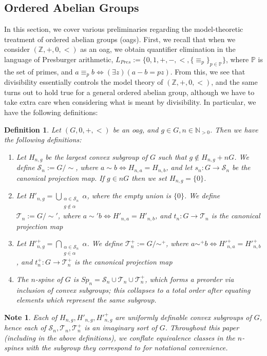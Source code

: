 \documentclass[a4paper,11pt]{article}
\newtheorem{definition}[theorem]{Definition}
\newtheorem*{note}{Note}
\renewcommand{\iff}{\Longleftrightarrow}
\newcommand{\nl}{\newline}
\newcommand{\Sn}{\mathcal{S}_n}
\newcommand{\Tn}{\mathcal{T}_n}
\newcommand{\Spn}{Sp_n}
\begin{document}
\subsection*{Ordered Abelian Groups}
In this section, we cover various preliminaries regarding the model-theoretic treatment of ordered abelian groups (oags). First, we recall that when we consider $(\mathbb{Z}, +, 0, <)$ as an oag, we obtain quantifier elimination in the language of Presburger arithmetic, $L_{Pres} := \{0, 1, +, -, <, \{\equiv_p\}_{p\in\mathbb{P}} \}$, where $\mathbb{P}$ is the set of primes, and $a\equiv_p b \iff (\exists z)(a-b = pz)$.
\nl\nl
From this, we see that divisibility essentially controls the model theory of $(\mathbb{Z}, +, 0, <)$, and the same turns out to hold true for a general ordered abelian group, although we have to take extra care when considering what is meant by divisibility. In particular, we have the following definitions:
\begin{definition}\label{SnTnTn^+}
	Let $(G, 0, +, <)$ be an oag, and $g\in G,n\in\mathbb{N}_{>0}$. Then we have the following definitions:
	\begin{enumerate}[(1)]
		\item Let $H_{n,g}$ be the largest convex subgroup of $G$ such that $g\notin H_{n,g} + nG$. We define $\Sn := G/\sim$, where $a\sim b\iff H_{n,a} = H_{n,b}$, and let $s_n:G\rightarrow\Sn$ be the canonical projection map. If $g\in nG$ then we set $H_{n,g} = \{0\}$.
		\item Let $H'_{n,g} = \bigcup\limits_{\substack{\alpha\in\Sn\\g\notin\alpha}}\alpha$, where the empty union is $\{0\}$. We define $\Tn := G/\sim'$, where $a\sim' b\iff H'_{n,a} = H'_{n,b}$, and $t_n:G\rightarrow\Tn$ is the canonical projection map
		\item Let $H'^+_{n,g} = \bigcap\limits_{\substack{\alpha\in\Sn \\g \in\alpha}}\alpha$. We define $\Tn^+ := G/\sim^+$, where $a\sim^+b \iff H'^+_{n,a}=H'^+_{n,b}$, and $t_n^+:G\rightarrow \Tn^+$ is the canonical projection map
		\item The $n$-spine of $G$ is $\Spn = \Sn\cup\Tn\cup\Tn^+$, which forms a preorder via inclusion of convex subgroups; this collapses to a total order after equating elements which represent the same subgroup.
	\end{enumerate}
\end{definition}
\begin{note}
	Each of $H_{n,g}, H'_{n,g}, H'^{+}_{n,g}$ are uniformly definable convex subgroups of $G$, hence each of $\Sn, \Tn,\Tn^+$ is an imaginary sort of $G$. Throughout this paper (including in the above definitions), we conflate equivalence classes in the $n$-spines with the subgroup they correspond to for notational convenience.
\end{note}
\end{document}
